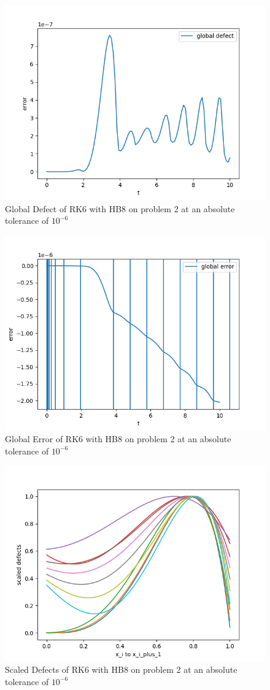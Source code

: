 \documentclass{article}
\begin{document}
\begin{figure}[H]
\centering
\includegraphics[width=0.7\linewidth]{./figures/rk6_with_hb8_p2_global_defect}
\caption{Global Defect of RK6 with HB8 on problem 2 at an absolute tolerance of $10^{-6}$}
\label{fig:rk6_with_hb8_p2_global_defect}
\end{figure}

\begin{figure}[H]
\centering
\includegraphics[width=0.7\linewidth]{./figures/rk6_with_hb8_p2_global_error}
\caption{Global Error of RK6 with HB8 on problem 2 at an absolute tolerance of $10^{-6}$}
\label{fig:rk6_with_hb8_p2_global_error}
\end{figure}

\begin{figure}[H]
\centering
\includegraphics[width=0.7\linewidth]{./figures/rk6_with_hb8_p2_scaled_defects}
\caption{Scaled Defects of RK6 with HB8 on problem 2 at an absolute tolerance of $10^{-6}$}
\label{fig:rk6_with_hb8_p2_scaled_defects}
\end{figure}
\end{document}
